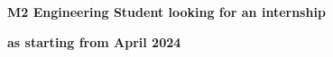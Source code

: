 \vspace{0.5cm}
\begin{center}
    {\Large {\color{black}\textbf{M2 Engineering Student looking for an internship}}}
\end{center}
\vspace{-2mm}
\begin{center}
    {\Large {\color{black}\textbf{as \jobTitle starting from April 2024}}}
\end{center}